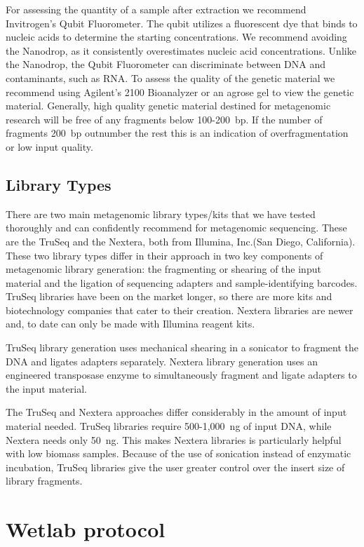 \documentclass[graybox]{svmult}
\begin{document}
For assessing the quantity of a sample after extraction we recommend Invitrogen’s Qubit Fluorometer. The qubit utilizes a fluorescent dye that binds to nucleic acids to determine the starting concentrations.  We recommend avoiding the Nanodrop, as it consistently overestimates nucleic acid concentrations. Unlike the Nanodrop, the Qubit Fluorometer can discriminate between DNA and contaminants, such as RNA.
%
To assess the quality of the genetic material we recommend using Agilent’s 2100 Bioanalyzer or an agrose gel to view the genetic material. Generally, high quality genetic material destined for metagenomic research will be free of any fragments below 100-200~bp.  If the number of fragments 200~bp outnumber the rest this is an indication of overfragmentation or low input quality.

\subsection{Library Types}
There are two main metagenomic library types/kits that we have tested thoroughly and can confidently recommend for metagenomic sequencing.  These are the TruSeq and the Nextera, both from Illumina, Inc.(San Diego, California). These two library types differ in their approach in two key components of metagenomic library generation: the fragmenting or shearing of the input material and the ligation of sequencing adapters and sample-identifying barcodes.  TruSeq libraries have been on the market longer, so there are more kits and biotechnology companies that cater to their creation. 
Nextera libraries are newer and, to date can only be made with Illumina reagent kits. 
 
TruSeq library generation uses mechanical shearing in a sonicator to fragment the DNA and ligates adapters separately. 
Nextera library generation uses an engineered transposase enzyme to simultaneously fragment and ligate adapters to the input material. 

The TruSeq and Nextera approaches differ considerably in the amount of input material needed. TruSeq libraries require 500-1,000~ng of input DNA, while Nextera needs only 50~ng.  This makes Nextera libraries is particularly helpful with low biomass samples.
Because of the use of sonication instead of enzymatic incubation, TruSeq libraries give the user greater control over the insert size of library fragments.  

\section{Wetlab protocol}
\end{document}
